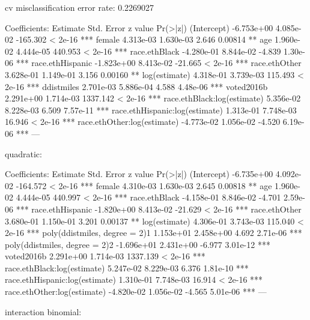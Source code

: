 cv misclassification error rate: 0.2269027

Coefficients:
                                 Estimate Std. Error  z value Pr(>|z|)    
(Intercept)                    -6.753e+00  4.085e-02 -165.302  < 2e-16 ***
female                          4.313e-03  1.630e-03    2.646  0.00814 ** 
age                             1.960e-02  4.444e-05  440.953  < 2e-16 ***
race.ethBlack                  -4.280e-01  8.844e-02   -4.839 1.30e-06 ***
race.ethHispanic               -1.823e+00  8.413e-02  -21.665  < 2e-16 ***
race.ethOther                   3.628e-01  1.149e-01    3.156  0.00160 ** 
log(estimate)                   4.318e-01  3.739e-03  115.493  < 2e-16 ***
ddistmiles                      2.701e-03  5.886e-04    4.588 4.48e-06 ***
voted2016b                      2.291e+00  1.714e-03 1337.142  < 2e-16 ***
race.ethBlack:log(estimate)     5.356e-02  8.228e-03    6.509 7.57e-11 ***
race.ethHispanic:log(estimate)  1.313e-01  7.748e-03   16.946  < 2e-16 ***
race.ethOther:log(estimate)    -4.773e-02  1.056e-02   -4.520 6.19e-06 ***
---



quadratic: 

Coefficients:
                                 Estimate Std. Error  z value Pr(>|z|)    
(Intercept)                    -6.735e+00  4.092e-02 -164.572  < 2e-16 ***
female                          4.310e-03  1.630e-03    2.645  0.00818 ** 
age                             1.960e-02  4.444e-05  440.997  < 2e-16 ***
race.ethBlack                  -4.158e-01  8.846e-02   -4.701 2.59e-06 ***
race.ethHispanic               -1.820e+00  8.413e-02  -21.629  < 2e-16 ***
race.ethOther                   3.680e-01  1.150e-01    3.201  0.00137 ** 
log(estimate)                   4.306e-01  3.743e-03  115.040  < 2e-16 ***
poly(ddistmiles, degree = 2)1   1.153e+01  2.458e+00    4.692 2.71e-06 ***
poly(ddistmiles, degree = 2)2  -1.696e+01  2.431e+00   -6.977 3.01e-12 ***
voted2016b                      2.291e+00  1.714e-03 1337.139  < 2e-16 ***
race.ethBlack:log(estimate)     5.247e-02  8.229e-03    6.376 1.81e-10 ***
race.ethHispanic:log(estimate)  1.310e-01  7.748e-03   16.914  < 2e-16 ***
race.ethOther:log(estimate)    -4.820e-02  1.056e-02   -4.565 5.01e-06 ***
---


interaction binomial:

